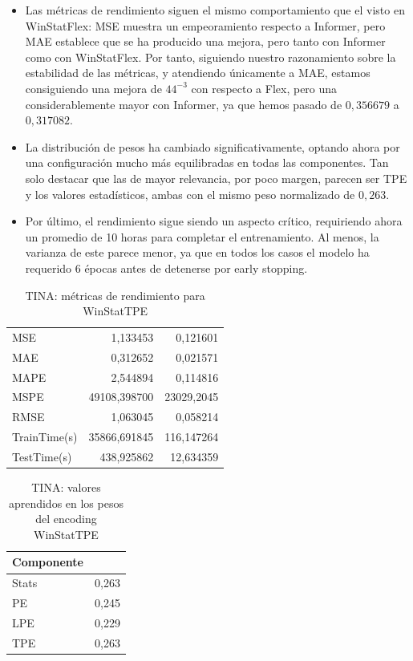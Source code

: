 \begin{itemize}
	\item Las métricas de rendimiento siguen el mismo comportamiento que el visto en WinStatFlex: MSE muestra un empeoramiento respecto a Informer, pero MAE establece que se ha producido una mejora, pero tanto con Informer como con WinStatFlex. Por tanto, siguiendo nuestro razonamiento sobre la estabilidad de las métricas, y atendiendo únicamente a MAE, estamos consiguiendo una mejora de $44^{-3}$ con respecto a Flex, pero una considerablemente mayor con Informer, ya que hemos pasado de $0,356679$ a $0,317082$.
	
	\item La distribución de pesos ha cambiado significativamente, optando ahora por una configuración mucho más equilibradas en todas las componentes. Tan solo destacar que las de mayor relevancia, por poco margen, parecen ser TPE y los valores estadísticos, ambas con el mismo peso normalizado de $0,263$.
	
	\item Por último, el rendimiento sigue siendo un aspecto crítico, requiriendo ahora un promedio de 10 horas para completar el entrenamiento. Al menos, la varianza de este parece menor, ya que en todos los casos el modelo ha requerido 6 épocas antes de detenerse por early stopping.
\end{itemize}


\begin{table}[!ht]
	\centering
	\begin{tabular}{l|N|N}
		\toprule
		 &  &  \\
		\midrule
		MSE & 1,133453 & 0,121601 \\
		MAE & 0,312652 & 0,021571 \\
		MAPE & 2,544894 & 0,114816 \\
		MSPE & 49108,398700 & 23029,2045 \\
		RMSE & 1,063045 & 0,058214 \\
		TrainTime(s) & 35866,691845 & 116,147264 \\
		TestTime(s) & 438,925862 & 12,634359 \\
		\bottomrule
	\end{tabular}
	\caption{TINA: métricas de rendimiento para WinStatTPE}
	\label{tinatpe}
\end{table}

\begin{table}[!ht]
	\centering
	\begin{tabular}{l|N}
		\toprule
		Componente &  \\
		\midrule
		Stats & 0,263 \\
		PE & 0,245 \\
		LPE & 0,229 \\
		TPE & 0,263 \\
		\bottomrule
	\end{tabular}
	\caption{TINA: valores aprendidos en los pesos del encoding WinStatTPE}
	\label{tinatpepesos}
\end{table}

